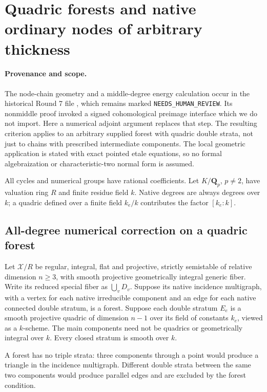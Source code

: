 \section{Quadric forests and native ordinary nodes of arbitrary thickness}
\label{r17qf:section}

\paragraph{Provenance and scope.}
The node-chain geometry and a middle-degree energy calculation occur
in the historical Round 7 file
, which remains
marked \texttt{NEEDS\_HUMAN\_REVIEW}.  Its nonmiddle proof invoked a
signed cohomological preimage interface which we do not import.
Here a numerical adjoint argument replaces that step.  The resulting
criterion applies to an arbitrary supplied forest with quadric double
strata, not just to chains with prescribed intermediate components.
The local geometric application is stated with exact pointed etale
equations, so no formal algebraization or characteristic-two normal
form is assumed.

All cycles and numerical groups have rational coefficients.  Let
$K/\mathbf Q_p$, $p\ne2$, have valuation ring $R$ and finite residue
field $k$.  Native degrees are always degrees over $k$; a quadric
defined over a finite field $k_e/k$ contributes the factor $[k_e:k]$.

\subsection{All-degree numerical correction on a quadric forest}

\begin{definition}
\label{r17qf:datum}
Let $\mathcal X/R$ be regular, integral, flat and projective,
strictly semistable of relative dimension $n\ge3$, with smooth
projective geometrically integral generic fiber.  Write its reduced
special fiber as $\bigcup_vD_v$.  Suppose its native incidence
multigraph, with a vertex for each native irreducible component and
an edge for each native connected double stratum, is a forest.
Suppose each double stratum $E_e$ is a smooth projective quadric of
dimension $n-1$ over its field of constants $k_e$, viewed as a
$k$-scheme.  The main components need not be quadrics or
geometrically integral over $k$.  Every closed stratum is smooth
over $k$.

A forest has no triple strata: three components through a point
would produce a triangle in the incidence multigraph.  Different
double strata between the same two components would produce parallel
edges and are excluded by the forest condition.
\end{definition}

